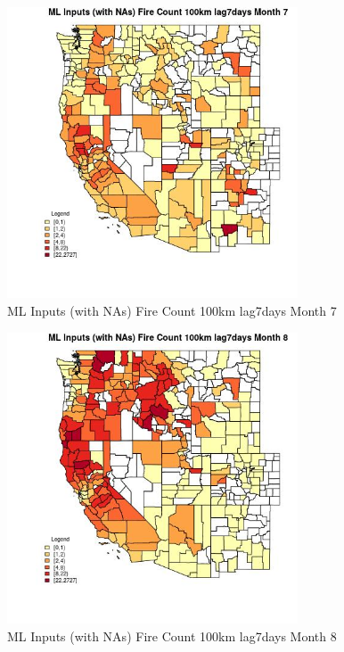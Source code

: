 \begin{figure} 
\centering  
\includegraphics[width=0.77\textwidth]{Code_Outputs/Report_ML_input_PM25_Step4_part_f_de_duplicated_aveswNAs_CountyFire_Count_100km_lag7daysmedianMonth7.jpg} 
\caption{\label{fig:Report_ML_input_PM25_Step4_part_f_de_duplicated_aveswNAsCountyFire_Count_100km_lag7daysmedianMonth7}ML Inputs (with NAs) Fire Count 100km lag7days Month 7} 
\end{figure} 
 

\begin{figure} 
\centering  
\includegraphics[width=0.77\textwidth]{Code_Outputs/Report_ML_input_PM25_Step4_part_f_de_duplicated_aveswNAs_CountyFire_Count_100km_lag7daysmedianMonth8.jpg} 
\caption{\label{fig:Report_ML_input_PM25_Step4_part_f_de_duplicated_aveswNAsCountyFire_Count_100km_lag7daysmedianMonth8}ML Inputs (with NAs) Fire Count 100km lag7days Month 8} 
\end{figure} 
 

